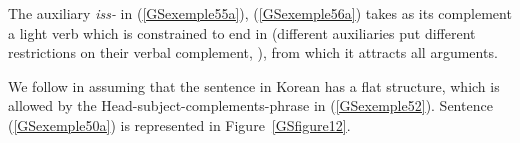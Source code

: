 \documentclass[output=paper
                ,modfonts
                ,nonflat
	        ,collection
	        ,collectionchapter
	        ,collectiontoclongg
 	        ,biblatex
                ,babelshorthands
                ,newtxmath
                ,draftmode
                ,colorlinks, citecolor=brown
]{./langsci/langscibook}
\begin{document}
{\begin{exe}
    \label{GSexemple57}
\end{exe}

The auxiliary \emph{iss-} in (\ref{GSexemple55a}), (\ref{GSexemple56a}) takes as its complement a light verb which is constrained to end in  (different auxiliaries put different restrictions on their verbal complement, \citealt{Yoo2003}), from which it attracts all arguments. 

We follow \cite{Chung98a-u} in assuming that the sentence in Korean has a flat structure, which is allowed by the Head-subject-complements-phrase in (\ref{GSexemple52}). Sentence (\ref{GSexemple50a}) is represented in Figure~\ref{GSfigure12}.

}
\end{document}
